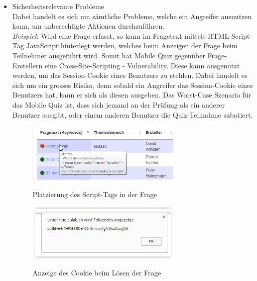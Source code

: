 	
	\begin{itemize}
		\item Sicherheitsrelevante Probleme \\
		Dabei handelt es sich um sämtliche Probleme, welche ein Angreifer ausnutzen kann, um unberechtigte Aktionen durchzuführen. \\
		\textit{Beispiel}: Wird eine Frage erfasst, so kann im Fragetext mittels HTML-Script-Tag JavaScript hinterlegt werden, welches beim Anzeigen der Frage beim Teilnehmer ausgeführt wird. Somit hat Mobile Quiz gegenüber Frage-Erstellern eine \gls{Cross-Site-Scripting} - \gls{Vulnerability}. Diese kann ausgenutzt werden, um das Session-Cookie eines Benutzers zu stehlen. Dabei handelt es sich um ein grosses Risiko, denn sobald ein Angreifer das Session-Cookie eines Benutzers hat, kann er sich als diesen ausgeben. Das Worst-Case Szenario für das Mobile Quiz ist, dass sich jemand an der Prüfung als ein anderer Benutzer ausgibt, oder einem anderen Benutzer die Quiz-Teilnahme sabotiert.
		
		
		\begin{figure}[H]
			\centering
			\includegraphics[width=0.7\textwidth
			]{Images/XSS_Frage.PNG}
			\caption{Platzierung des Script-Tags in der Frage}
			\cite{mobilequiz.ch}
		\end{figure}
		
		\begin{figure}[H]
			\centering
			\includegraphics[width=0.7\textwidth
			]{Images/XSS_Cookie.PNG}
			\caption{Anzeige des Cookie beim Lösen der Frage}
			\cite{mobilequiz.ch}
		\end{figure}
		

\end{itemize}

